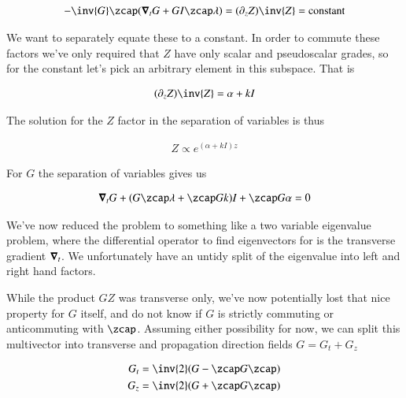 \begin{align}\label{eqn:radiationGeometry:fooc3}
-\inv{G} \zcap (\spacegrad_t G + G I \zcap \lambda) = (\partial_z Z)\inv{Z} = \text{constant}
\end{align}

We want to separately equate these to a constant.  In order to commute these factors we've only required that $Z$ have only scalar and pseudoscalar grades, so for the constant let's pick an arbitrary element in this subspace.  That is

\begin{align}\label{eqn:radiationGeometry:fooc4}
(\partial_z Z)\inv{Z} = \alpha + k I
\end{align}

The solution for the $Z$ factor in the separation of variables is thus

\begin{align}\label{eqn:radiationGeometry:fooc5}
Z \propto e^{(\alpha + k I)z}
\end{align}

For $G$ the separation of variables gives us

\begin{align}\label{eqn:radiationGeometry:fooc6}
\spacegrad_t G + (G \zcap \lambda + \zcap G k) I + \zcap G \alpha = 0
\end{align}

We've now reduced the problem to something like a two variable eigenvalue problem, where the differential operator to find eigenvectors for is the transverse gradient $\boldsymbol{\nabla}_t$.  We unfortunately have an untidy split of the eigenvalue into left and right hand factors.
%

While the product $GZ$ was transverse only, we've now potentially lost that nice property for $G$ itself, and do not know if $G$ is strictly commuting or anticommuting with $\zcap$.  Assuming either possibility for now, we can split this multivector into transverse and propagation direction fields $G = G_t + G_z$

\begin{align}\label{eqn:radiationGeometry:fooc7}
G_t &= \inv{2}(G - \zcap G \zcap) \\
G_z &= \inv{2}(G + \zcap G \zcap)
\end{align}

